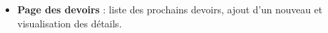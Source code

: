 \documentclass[12pt]{report}
\begin{document}
\begin{itemize}
	\item \textbf{Page des devoirs} : liste des prochains devoirs, ajout d’un nouveau et visualisation des détails.
	
	\begin{figure}[H]
		\centering
		\begin{minipage}[t]{0.32\textwidth}
			\centering

\end{minipage}
\end{figure}
\end{itemize}
\end{document}
